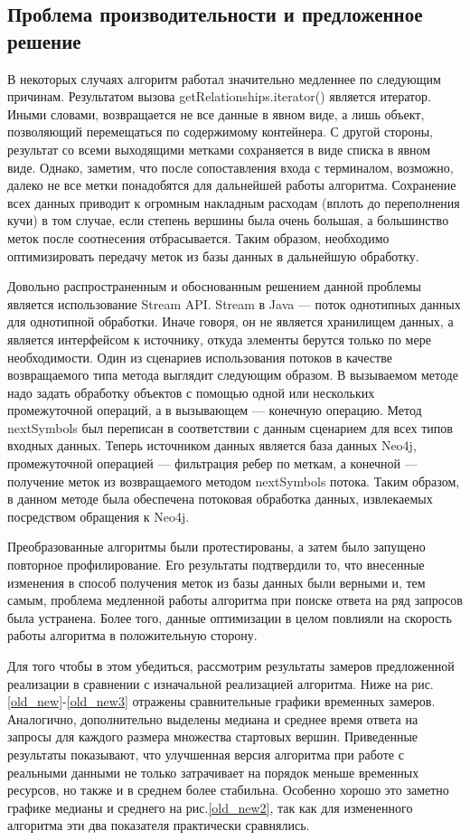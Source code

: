 \documentclass[14pt]{matmex-diploma-custom}
\theoremstyle{definition}
\begin{document}
\subsection{Проблема производительности и предложенное решение}

В некоторых случаях алгоритм работал значительно медленнее по следующим причинам. Результатом вызова getRelationships.iterator() является итератор. Иными словами, возвращается не все данные в явном виде, а лишь объект, позволяющий перемещаться по содержимому контейнера. С другой стороны, результат со всеми выходящими метками сохраняется в виде списка в явном виде. Однако, заметим, что после сопоставления входа с терминалом, возможно, далеко не все метки понадобятся для дальнейшей работы алгоритма. Сохранение всех данных приводит к огромным накладным расходам (вплоть до переполнения кучи) в том случае, если степень вершины была очень большая, а большинство меток после соотнесения отбрасывается.
Таким образом, необходимо оптимизировать передачу меток из базы данных в дальнейшую обработку.

Довольно распространенным и обоснованным решением данной проблемы является использование Stream API. Stream в Java --- поток однотипных данных для однотипной обработки. Иначе говоря, он не является хранилищем данных, а является интерфейсом к источнику, откуда элементы берутся только по мере необходимости. Один из сценариев использования потоков в качестве возвращаемого типа метода выглядит следующим образом. В вызываемом методе надо задать обработку объектов с помощью одной или нескольких промежуточной операций, а в вызывающем --- конечную операцию. Метод nextSymbols был переписан в соответствии с данным сценарием для всех типов входных данных. Теперь источником данных является база данных Neo4j, промежуточной операцией --- фильтрация ребер по меткам, а конечной --- получение меток из возвращаемого методом nextSymbols потока. Таким образом, в данном методе была обеспечена потоковая обработка данных, извлекаемых посредством обращения к Neo4j.

Преобразованные алгоритмы были протестированы, а затем было запущено повторное профилирование. Его результаты подтвердили то, что внесенные изменения в способ получения меток из базы данных были верными и, тем самым, проблема медленной работы алгоритма при поиске ответа на ряд запросов была устранена. Более того, данные оптимизации в целом повлияли на скорость работы алгоритма в положительную сторону. 

Для того чтобы в этом убедиться, рассмотрим результаты замеров предложенной реализации в сравнении с изначальной реализацией алгоритма.
Ниже  на рис.\ref{old_new}-\ref{old_new3} отражены сравнительные графики временных замеров. Аналогично, дополнительно выделены медиана и среднее время ответа на запросы для каждого размера множества стартовых вершин. Приведенные результаты показывают, что улучшенная версия алгоритма при работе с реальными данными не только затрачивает на порядок меньше временных ресурсов, но также и в среднем более стабильна. Особенно хорошо это заметно графике медианы и среднего на рис.\ref{old_new2}, так как для измененного алгоритма эти два показателя практически сравнялись.
\end{document}
